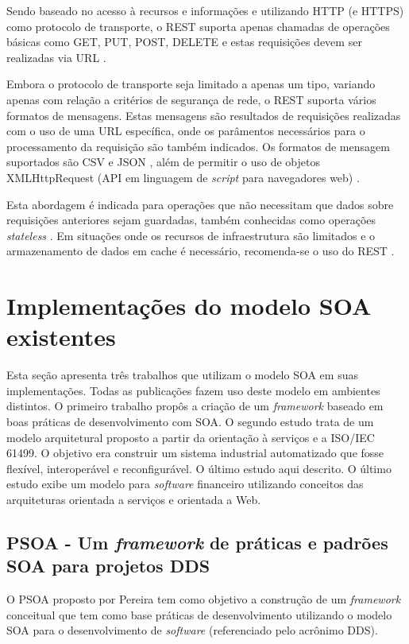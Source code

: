 Sendo baseado no acesso à recursos e informações e utilizando HTTP (e HTTPS) como protocolo de transporte, o REST suporta apenas chamadas de operações básicas como GET, PUT, POST, DELETE e estas requisições devem ser realizadas via URL \cite{rozlog_restesoap_2013}.

Embora o protocolo de transporte seja limitado a apenas um tipo, variando apenas com relação a critérios de segurança de rede, o REST suporta vários formatos de mensagens. Estas mensagens são resultados de requisições realizadas com o uso de uma URL específica, onde os parâmentos necessários para o processamento da requisição são também indicados. Os formatos de mensagem suportados são CSV e JSON \cite{mueller_understanding_2013}, além de permitir o uso de objetos XMLHttpRequest (API em linguagem de \textit{script} para navegadores web) \cite{rozlog_restesoap_2013}.

Esta abordagem é indicada para operações que não necessitam que dados sobre requisições anteriores sejam guardadas, também conhecidas como operações \textit{stateless} \cite{rozlog_restesoap_2013}. Em situações onde os recursos de infraestrutura são limitados e o armazenamento de dados em cache é necessário, recomenda-se o uso do REST \cite{rozlog_restesoap_2013}.

\section{Implementações do modelo SOA existentes}

Esta seção apresenta três trabalhos que utilizam o modelo SOA em suas implementações. Todas as publicações fazem uso deste modelo em ambientes distintos. O primeiro trabalho propôs a criação de um \textit{framework} baseado em boas práticas de desenvolvimento com SOA. O segundo estudo trata de um modelo arquitetural proposto a partir da orientação à serviços e a ISO/IEC 61499. O objetivo era construir um sistema industrial automatizado que fosse flexível, interoperável e reconfigurável. O último estudo aqui descrito. O último estudo exibe um modelo para \textit{software} financeiro utilizando conceitos das arquiteturas orientada a serviços e orientada a Web.

\subsection{PSOA - Um \textit{framework} de práticas e padrões SOA para projetos DDS}

O PSOA proposto por Pereira \cite{pereira_psoa_2011} tem como objetivo a construção de um \textit{framework} conceitual que tem como base práticas de desenvolvimento utilizando o modelo SOA para o desenvolvimento de \textit{software} (referenciado pelo acrônimo DDS). 


